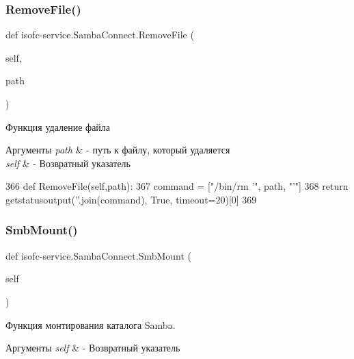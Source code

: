 \subsubsection{\texorpdfstring{Remove\+File()}{RemoveFile()}}
{\footnotesize\ttfamily def isofc-\/service.\+Samba\+Connect.\+Remove\+File (\begin{DoxyParamCaption}\item[{}]{self,  }\item[{}]{path }\end{DoxyParamCaption})}



Функция удаление файла 


\begin{DoxyParams}{Аргументы}
{\em path} & -\/ путь к файлу, который удаляется\\
\hline
{\em self} & -\/ Возвратный указатель \\
\hline
\end{DoxyParams}

\begin{DoxyCode}
366     \textcolor{keyword}{def }RemoveFile(self,path):
367         command = [\textcolor{stringliteral}{"/bin/rm '"}, path, \textcolor{stringliteral}{"'"}]
368         \textcolor{keywordflow}{return} getstatusoutput(\textcolor{stringliteral}{''}.join(command), \textcolor{keyword}{True}, timeout=20)[0]
369 
\end{DoxyCode}
\mbox{\label{classisofc-service_1_1SambaConnect_a95a21d63db6f88fd43eb6a8958bb174d}} 
\subsubsection{\texorpdfstring{Smb\+Mount()}{SmbMount()}}
{\footnotesize\ttfamily def isofc-\/service.\+Samba\+Connect.\+Smb\+Mount (\begin{DoxyParamCaption}\item[{}]{self }\end{DoxyParamCaption})}



Функция монтирования каталога Samba. 


\begin{DoxyParams}{Аргументы}
{\em self} & -\/ Возвратный указатель \\
\hline
\end{DoxyParams}

